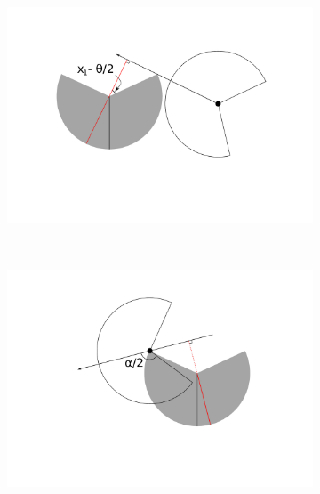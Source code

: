 \begin{figure}[t]
        \centering
        \begin{subfigure}[t]{0.3\textwidth}
                \centering
        \includegraphics[width=1\textwidth, trim=5cm 3cm 4cm 1cm]{imgs/ne2.pdf}
                \caption{}
                \label{f:NELimit}
        \end{subfigure}
        ~ 
        \begin{subfigure}[t]{0.3\textwidth}
                \centering
                       \includegraphics[width=1\textwidth, trim=4cm 2cm 6cm 0cm]{imgs/ne33.pdf}
                \caption{}
                \label{f:NE3third}
        \end{subfigure}
        ~ 
        \begin{subfigure}[t]{0.3\textwidth}
                \centering

\end{subfigure}
\end{figure}
